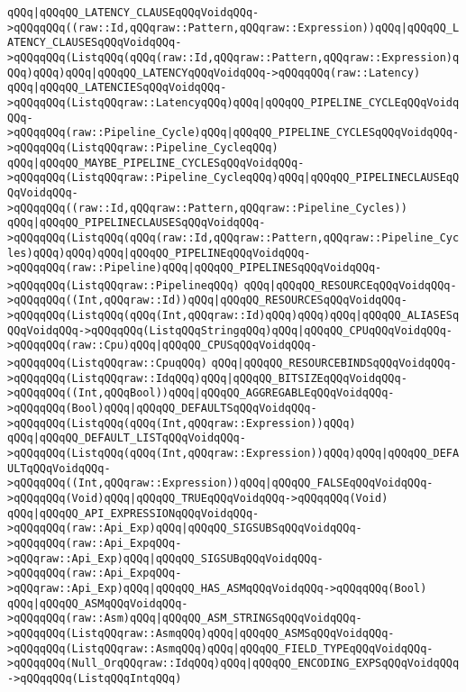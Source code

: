 \verb|qQQq|\verb#|qQQqQQ_LATENCY_CLAUSEqQQqVoidqQQq->qQQqqQQq((raw::Id,qQQqraw::Pattern,qQQqraw::Expression))qQQq|qQQqQQ_LATENCY_CLAUSESqQQqVoidqQQq->qQQqqQQq(ListqQQq(qQQq(raw::Id,qQQqraw::Pattern,qQQqraw::Expression)qQQq)qQQq)qQQq|qQQqQQ_LATENCYqQQqVoidqQQq->qQQqqQQq(raw::Latency)#\newline
\verb|qQQq|\verb#|qQQqQQ_LATENCIESqQQqVoidqQQq->qQQqqQQq(ListqQQqraw::LatencyqQQq)qQQq|qQQqQQ_PIPELINE_CYCLEqQQqVoidqQQq->qQQqqQQq(raw::Pipeline_Cycle)qQQq|qQQqQQ_PIPELINE_CYCLESqQQqVoidqQQq->qQQqqQQq(ListqQQqraw::Pipeline_CycleqQQq)#\newline
\verb|qQQq|\verb#|qQQqQQ_MAYBE_PIPELINE_CYCLESqQQqVoidqQQq->qQQqqQQq(ListqQQqraw::Pipeline_CycleqQQq)qQQq|qQQqQQ_PIPELINECLAUSEqQQqVoidqQQq->qQQqqQQq((raw::Id,qQQqraw::Pattern,qQQqraw::Pipeline_Cycles))#\newline
\verb|qQQq|\verb#|qQQqQQ_PIPELINECLAUSESqQQqVoidqQQq->qQQqqQQq(ListqQQq(qQQq(raw::Id,qQQqraw::Pattern,qQQqraw::Pipeline_Cycles)qQQq)qQQq)qQQq|qQQqQQ_PIPELINEqQQqVoidqQQq->qQQqqQQq(raw::Pipeline)qQQq|qQQqQQ_PIPELINESqQQqVoidqQQq->qQQqqQQq(ListqQQqraw::PipelineqQQq)#\newline
\verb|qQQq|\verb#|qQQqQQ_RESOURCEqQQqVoidqQQq->qQQqqQQq((Int,qQQqraw::Id))qQQq|qQQqQQ_RESOURCESqQQqVoidqQQq->qQQqqQQq(ListqQQq(qQQq(Int,qQQqraw::Id)qQQq)qQQq)qQQq|qQQqQQ_ALIASESqQQqVoidqQQq->qQQqqQQq(ListqQQqStringqQQq)qQQq|qQQqQQ_CPUqQQqVoidqQQq->qQQqqQQq(raw::Cpu)qQQq|qQQqQQ_CPUSqQQqVoidqQQq->qQQqqQQq(ListqQQqraw::CpuqQQq)#\newline
\verb|qQQq|\verb#|qQQqQQ_RESOURCEBINDSqQQqVoidqQQq->qQQqqQQq(ListqQQqraw::IdqQQq)qQQq|qQQqQQ_BITSIZEqQQqVoidqQQq->qQQqqQQq((Int,qQQqBool))qQQq|qQQqQQ_AGGREGABLEqQQqVoidqQQq->qQQqqQQq(Bool)qQQq|qQQqQQ_DEFAULTSqQQqVoidqQQq->qQQqqQQq(ListqQQq(qQQq(Int,qQQqraw::Expression))qQQq)#\newline
\verb|qQQq|\verb#|qQQqQQ_DEFAULT_LISTqQQqVoidqQQq->qQQqqQQq(ListqQQq(qQQq(Int,qQQqraw::Expression))qQQq)qQQq|qQQqQQ_DEFAULTqQQqVoidqQQq->qQQqqQQq((Int,qQQqraw::Expression))qQQq|qQQqQQ_FALSEqQQqVoidqQQq->qQQqqQQq(Void)qQQq|qQQqQQ_TRUEqQQqVoidqQQq->qQQqqQQq(Void)#\newline
\verb|qQQq|\verb#|qQQqQQ_API_EXPRESSIONqQQqVoidqQQq->qQQqqQQq(raw::Api_Exp)qQQq|qQQqQQ_SIGSUBSqQQqVoidqQQq->qQQqqQQq(raw::Api_ExpqQQq->qQQqraw::Api_Exp)qQQq|qQQqQQ_SIGSUBqQQqVoidqQQq->qQQqqQQq(raw::Api_ExpqQQq->qQQqraw::Api_Exp)qQQq|qQQqQQ_HAS_ASMqQQqVoidqQQq->qQQqqQQq(Bool)#\newline
\verb|qQQq|\verb#|qQQqQQ_ASMqQQqVoidqQQq->qQQqqQQq(raw::Asm)qQQq|qQQqQQ_ASM_STRINGSqQQqVoidqQQq->qQQqqQQq(ListqQQqraw::AsmqQQq)qQQq|qQQqQQ_ASMSqQQqVoidqQQq->qQQqqQQq(ListqQQqraw::AsmqQQq)qQQq|qQQqQQ_FIELD_TYPEqQQqVoidqQQq->qQQqqQQq(Null_OrqQQqraw::IdqQQq)qQQq|qQQqQQ_ENCODING_EXPSqQQqVoidqQQq->qQQqqQQq(ListqQQqIntqQQq)#\newline
